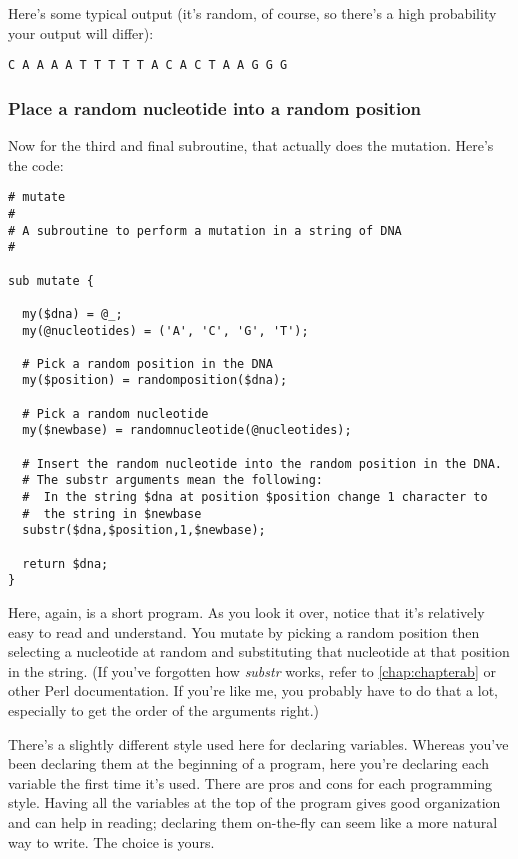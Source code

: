 Here's some typical output (it's random, of course, so there's a high probability your output will differ):

\begin{lstlisting}
C A A A A T T T T T A C A C T A A G G G 
\end{lstlisting}

\subsubsection{Place a random nucleotide into a random position}
Now for the third and final subroutine, that actually does the mutation. Here's the code: 

\begin{lstlisting}
# mutate
#
# A subroutine to perform a mutation in a string of DNA
#

sub mutate {

  my($dna) = @_;
  my(@nucleotides) = ('A', 'C', 'G', 'T');

  # Pick a random position in the DNA
  my($position) = randomposition($dna);

  # Pick a random nucleotide
  my($newbase) = randomnucleotide(@nucleotides);

  # Insert the random nucleotide into the random position in the DNA.
  # The substr arguments mean the following:
  #  In the string $dna at position $position change 1 character to
  #  the string in $newbase
  substr($dna,$position,1,$newbase);

  return $dna;
}
\end{lstlisting}

Here, again, is a short program. As you look it over, notice that it's relatively easy to read and understand. You mutate by picking a random position then selecting a nucleotide at random and substituting that nucleotide at that position in the string. (If you've forgotten how \textit{substr} works, refer to \autoref{chap:chapterab} or other Perl documentation. If you're like me, you probably have to do that a lot, especially to get the order of the arguments right.)

There's a slightly different style used here for declaring variables. Whereas you've been declaring them at the beginning of a program, here you're declaring each variable the first time it's used. There are pros and cons for each programming style. Having all the variables at the top of the program gives good organization and can help in reading; declaring them on-the-fly can seem like a more natural way to write. The choice is yours.


